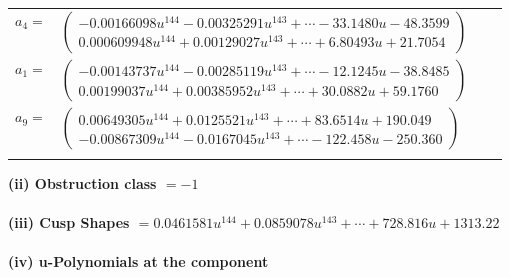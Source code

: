 \documentclass[1p]{elsarticle_modified}
\theoremstyle{definition}
\begin{document}
\begin{tabular}{m{7pt} m{180pt} m{7pt} m{180pt} }
\flushright $a_{4}=$&$\begin{pmatrix}-0.00166098 u^{144}-0.00325291 u^{143}+\cdots-33.1480 u-48.3599\\0.000609948 u^{144}+0.00129027 u^{143}+\cdots+6.80493 u+21.7054\end{pmatrix}$ \\
\flushright $a_{1}=$&$\begin{pmatrix}-0.00143737 u^{144}-0.00285119 u^{143}+\cdots-12.1245 u-38.8485\\0.00199037 u^{144}+0.00385952 u^{143}+\cdots+30.0882 u+59.1760\end{pmatrix}$ \\
\flushright $a_{9}=$&$\begin{pmatrix}0.00649305 u^{144}+0.0125521 u^{143}+\cdots+83.6514 u+190.049\\-0.00867309 u^{144}-0.0167045 u^{143}+\cdots-122.458 u-250.360\end{pmatrix}$\\&\end{tabular}
\flushleft \textbf{(ii) Obstruction class $= -1$}\\~\\
\flushleft \textbf{(iii) Cusp Shapes $= 0.0461581 u^{144}+0.0859078 u^{143}+\cdots+728.816 u+1313.22$}\\~\\
\newpage\renewcommand{\arraystretch}{1}
\flushleft \textbf{(iv) u-Polynomials at the component}\newline \\
\end{document}
